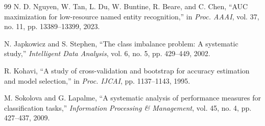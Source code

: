 \documentclass[conference,a4paper]{IEEEtran}
\begin{document}
\begin{thebibliography}{99}
N. D. Nguyen, W. Tan, L. Du, W. Buntine, R. Beare, and C. Chen,
``AUC maximization for low-resource named entity recognition,''
in \emph{Proc. AAAI}, vol. 37, no. 11, pp. 13389--13399, 2023.

N. Japkowicz and S. Stephen,
``The class imbalance problem: A systematic study,''
\emph{Intelligent Data Analysis}, vol. 6, no. 5, pp. 429--449, 2002.

R. Kohavi,
``A study of cross-validation and bootstrap for accuracy estimation and model selection,''
in \emph{Proc. IJCAI}, pp. 1137--1143, 1995.

M. Sokolova and G. Lapalme,
``A systematic analysis of performance measures for classification tasks,''
\emph{Information Processing \& Management}, vol. 45, no. 4, pp. 427--437, 2009.

\end{thebibliography}
\end{document}
